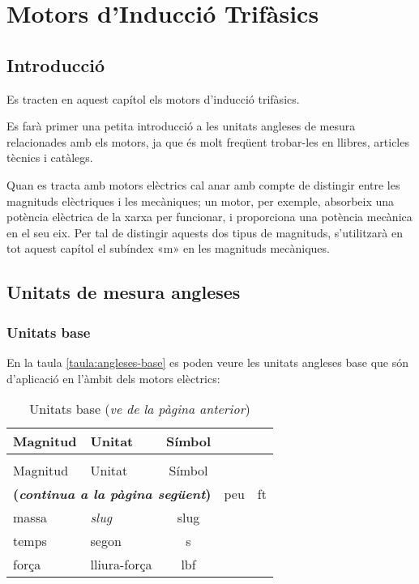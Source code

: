 
\chapter{Motors d'Inducció Trifàsics}\label{sec:ch-motors-ind}

\section{Introducció}

Es tracten en aquest capítol els motors d'inducció trifàsics.

Es farà primer una petita introducció a les unitats angleses de mesura  relacionades amb els motors, ja que és molt freqüent trobar-les en llibres, articles tècnics i catàlegs.

Quan es tracta amb motors elèctrics cal anar amb compte de distingir  entre les magnituds elèctriques i les mecàniques; un motor, per exemple, absorbeix una potència elèctrica de la xarxa per funcionar, i proporciona una potència mecànica en el seu eix. Per tal de distingir aquests dos tipus de magnituds, s'utilitzarà en tot aquest capítol el subíndex «m» en les magnituds mecàniques.

\section{Unitats de mesura angleses}

\subsection{Unitats base}

En la taula \vref{taula:angleses-base} es poden veure les unitats angleses base  que són d'aplicació en l'àmbit dels motors elèctrics:
\begin{longtable}[h]{llc}
   \caption{\label{taula:angleses-base}Unitats angleses base}\\
   \toprule[1pt]
    Magnitud & Unitat & Símbol \\
   \midrule
   \endfirsthead
   \caption[]{Unitats base (\emph{ve de la pàgina anterior})}\\
   \toprule[1pt]
    Magnitud & Unitat & Símbol \\
   \midrule
   \endhead
   \midrule
   \multicolumn{3}{r}{\sffamily\bfseries\color{NavyBlue}(\emph{continua a la pàgina següent})}
   \endfoot
   \endlastfoot
   longitud & peu & ft \\
   massa & \textit{slug} & slug \\
   temps & segon & s\\
   força & lliura-força & lbf \\
   \bottomrule[1pt]
\end{longtable}

